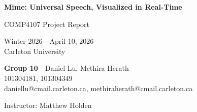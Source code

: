 \pagestyle{empty}

\begin{titlepage}
        \begin{center}
        \vspace*{3.0cm}

        \Huge
        {\bf Mime: Universal Speech, Visualized in Real-Time \\}

        \vspace*{0.5cm}

        \Large
        COMP4107 Project Report \\

        \vspace*{1.5cm}

        \normalsize
        Winter 2026 - April 10, 2026 \\
        Carleton University \\

        \vspace*{1.0cm}

        \textbf{Group 10} - Daniel Lu, Methira Herath \\

        \normalsize
        101304181, 101304349 \\
        daniellu@cmail.carleton.ca, methiraherath@cmail.carleton.ca \\

        \vspace*{1.0cm}

        \normalsize
        Instructor: Matthew Holden \\

        \end{center}
\end{titlepage}

\pagestyle{plain}
\setcounter{page}{2}

\cleardoublepage %


